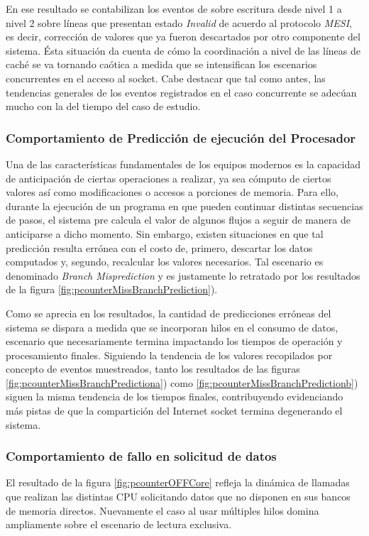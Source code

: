En ese resultado se contabilizan los eventos de sobre escritura desde nivel 1 a nivel 2 sobre líneas que presentan estado \emph{Invalid} de acuerdo al protocolo \emph{MESI}, es decir, corrección de valores que ya fueron descartados por otro componente del sistema. Ésta situación da cuenta de cómo la coordinación a nivel de las líneas de caché se va tornando caótica a medida que se intensifican los escenarios concurrentes en el acceso al socket. Cabe destacar que tal como antes, las tendencias generales de los eventos registrados en el caso concurrente se adecúan mucho con la del tiempo del caso de estudio.

\subsubsection{Comportamiento de Predicción de ejecución del Procesador}
Una de las características fundamentales de los equipos modernos es la capacidad de anticipación de ciertas operaciones a realizar, ya sea cómputo de ciertos valores así como modificaciones o accesos a porciones de memoria. Para ello, durante la ejecución de un programa en que pueden continuar distintas secuencias de pasos, el sistema pre calcula el valor de algunos flujos a seguir de manera de anticiparse a dicho momento. Sin embargo, existen situaciones en que tal predicción resulta errónea con el costo de, primero, descartar los datos computados y, segundo, recalcular los valores necesarios. Tal escenario es denominado \emph{Branch Misprediction} y es justamente lo retratado por los resultados de la figura \ref{fig:pcounterMissBranchPrediction}).

Como se aprecia en los resultados, la cantidad de predicciones erróneas del sistema se dispara a medida que se incorporan hilos en el consumo de datos, escenario que necesariamente termina impactando los tiempos de operación y procesamiento finales. Siguiendo la tendencia de los valores recopilados por concepto de eventos muestreados, tanto los resultados de las figuras \ref{fig:pcounterMissBranchPredictiona}) como \ref{fig:pcounterMissBranchPredictionb}) siguen la misma tendencia de los tiempos finales, contribuyendo evidenciando más pistas de que la compartición del Internet socket termina degenerando el sistema.

\subsubsection{Comportamiento de fallo en solicitud de datos}
El resultado de la figura \ref{fig:pcounterOFFCore} refleja la dinámica de llamadas que realizan las distintas CPU solicitando datos que no disponen en sus bancos de memoria directos. Nuevamente el caso al usar múltiples hilos domina ampliamente sobre el escenario de lectura exclusiva.

